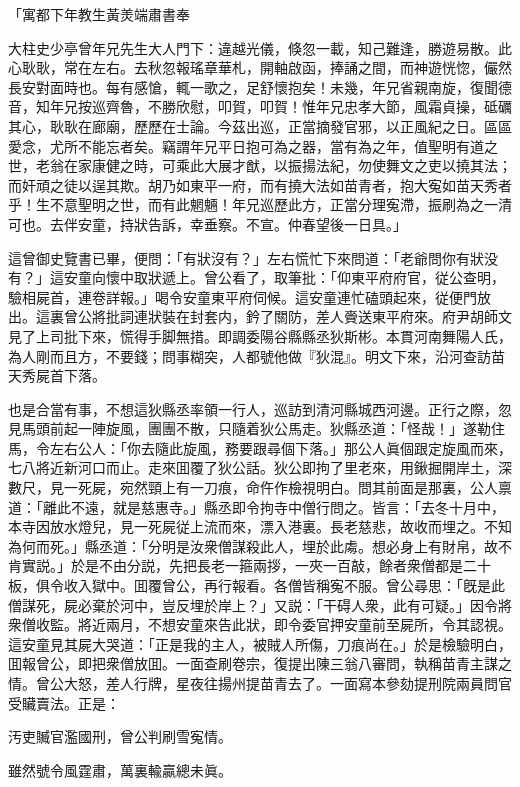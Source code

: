 「寓都下年教生黃羙端肅書奉

大柱史少亭曾年兄先生大人門下：違越光儀，倏忽一載，知己難逢，勝遊易散。此心耿耿，常在左右。去秋忽報瑤章華札，開軸啟函，捧誦之間，而神遊恍惚，儼然長安對面時也。每有感愴，輒一歌之，足舒懷抱矣！未幾，年兄省親南旋，復聞德音，知年兄按巡齊魯，不勝欣慰，叩賀，叩賀！惟年兄忠孝大節，風霜貞操，砥礪其心，耿耿在廊廟，歷歷在士論。今茲出巡，正當摘發官邪，以正風紀之日。區區愛念，尤所不能忘者矣。竊謂年兄平日抱可為之器，當有為之年，值聖明有道之世，老翁在家康健之時，可乘此大展才猷，以振揚法紀，勿使舞文之吏以撓其法；而奸頑之徒以逞其欺。胡乃如東平一府，而有撓大法如苗青者，抱大寃如苗天秀者乎！生不意聖明之世，而有此魍魎！年兄巡歷此方，正當分理寃滯，振刷為之一清可也。去伴安童，持狀告訴，幸垂察。不宣。仲春望後一日具。」

這曾御史覽書已畢，便問：「有狀沒有？」左右慌忙下來問道：「老爺問你有狀没有？」這安童向懷中取狀遞上。曾公看了，取筆批：「仰東平府府官，従公查明，驗相屍首，連卷詳報。」喝令安童東平府伺候。這安童連忙磕頭起來，従便門放出。這裏曾公將批詞連狀裝在封套内，鈐了關防，差人賫送東平府來。府尹胡師文見了上司批下來，慌得手脚無措。即調委陽谷縣縣丞狄斯彬。本貫河南舞陽人氏，為人剛而且方，不要錢；問事糊突，人都號他做『狄混』。明文下來，沿河查訪苗天秀屍首下落。

也是合當有事，不想這狄縣丞率領一行人，巡訪到清河縣城西河邊。正行之際，忽見馬頭前起一陣旋風，團團不散，只隨着狄公馬走。狄縣丞道：「怪哉！」遂勒住馬，令左右公人：「你去隨此旋風，務要跟尋個下落。」那公人眞個跟定旋風而來，七八將近新河口而止。走來囬覆了狄公話。狄公即拘了里老來，用鍬掘開岸土，深數尺，見一死屍，宛然頸上有一刀痕，命仵作檢視明白。問其前面是那裏，公人禀道：「離此不遠，就是慈惠寺。」縣丞即令拘寺中僧行問之。皆言：「去冬十月中，本寺因放水燈兒，見一死屍従上流而來，漂入港裏。長老慈悲，故收而埋之。不知為何而死。」縣丞道：「分明是汝衆僧謀殺此人，埋於此䖏。想必身上有財帛，故不肯實説。」於是不由分説，先把長老一箍兩拶，一夾一百敲，餘者衆僧都是二十板，俱令收入獄中。囬覆曾公，再行報看。各僧皆稱寃不服。曾公尋思：「旣是此僧謀死，屍必棄於河中，豈反埋於岸上？」又説：「干碍人衆，此有可疑。」因令將衆僧收監。將近兩月，不想安童來告此狀，即令委官押安童前至屍所，令其認視。這安童見其屍大哭道：「正是我的主人，被賊人所傷，刀痕尚在。」於是檢驗明白，囬報曾公，即把衆僧放囬。一面查刷卷宗，復提出陳三翁八審問，執稱苗青主謀之情。曾公大怒，差人行牌，星夜往揚州提苗青去了。一面寫本參劾提刑院兩員問官受贜賣法。正是：

汚吏贓官濫國刑，曾公判刷雪寃情。

雖然號令風霆肅，萬裏輸贏總未眞。

